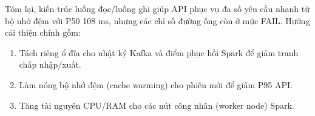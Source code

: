 \documentclass[../BTL.tex]{subfiles}
\begin{document}
Tóm lại, kiến trúc luồng đọc/luồng ghi giúp API phục vụ đa số yêu cầu nhanh từ bộ nhớ đệm với P50 108 ms, nhưng các chỉ số đường ống còn ở mức FAIL. Hướng cải thiện chính gồm:
\begin{enumerate}
    \item Tách riêng ổ đĩa cho nhật ký Kafka và điểm phục hồi Spark để giảm tranh chấp nhập/xuất.
    \item Làm nóng bộ nhớ đệm (cache warming) cho phiên mới để giảm P95 API.
    \item Tăng tài nguyên CPU/RAM cho các nút công nhân (worker node) Spark.
\end{enumerate}
\end{document}
